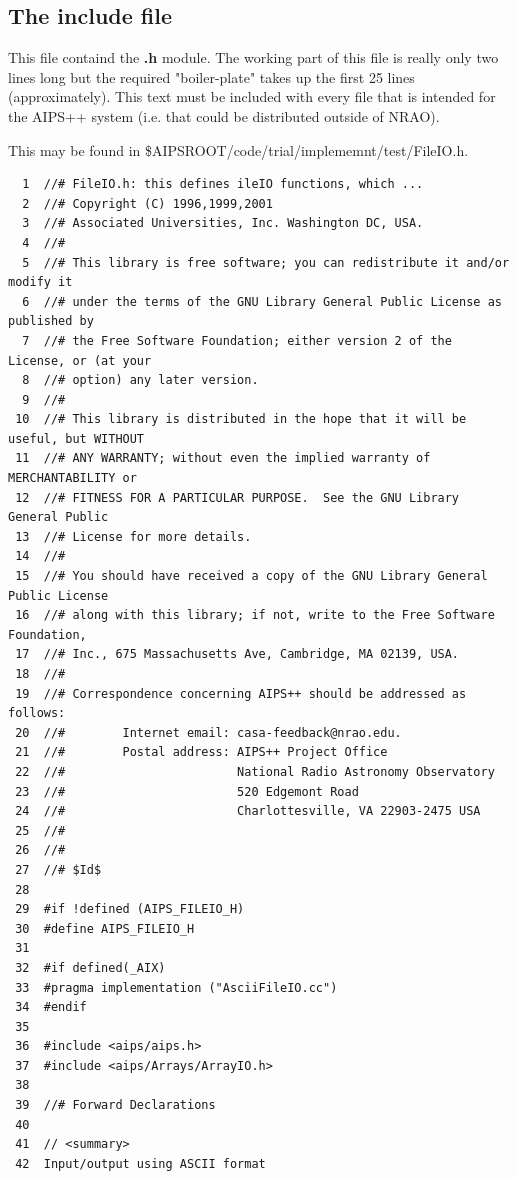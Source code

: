 \newpage
\subsection{The {\bf include} file}

        This file containd the {\bf .h} module.         The working part of
this file is really only two lines long but the required
"boiler-plate" takes up the first 25 lines (approximately). This text
must be included with every file that is intended for the AIPS++
system (i.e. that could be distributed outside of NRAO).  



\newpage

This 
may be found in \$AIPSROOT/code/trial/implememnt/test/FileIO.h.
\begin{verbatim}
  1  //# FileIO.h: this defines ileIO functions, which ...
  2  //# Copyright (C) 1996,1999,2001
  3  //# Associated Universities, Inc. Washington DC, USA.
  4  //#
  5  //# This library is free software; you can redistribute it and/or modify it
  6  //# under the terms of the GNU Library General Public License as published by
  7  //# the Free Software Foundation; either version 2 of the License, or (at your
  8  //# option) any later version.
  9  //#
 10  //# This library is distributed in the hope that it will be useful, but WITHOUT
 11  //# ANY WARRANTY; without even the implied warranty of MERCHANTABILITY or
 12  //# FITNESS FOR A PARTICULAR PURPOSE.  See the GNU Library General Public
 13  //# License for more details.
 14  //#
 15  //# You should have received a copy of the GNU Library General Public License
 16  //# along with this library; if not, write to the Free Software Foundation,
 17  //# Inc., 675 Massachusetts Ave, Cambridge, MA 02139, USA.
 18  //#
 19  //# Correspondence concerning AIPS++ should be addressed as follows:
 20  //#        Internet email: casa-feedback@nrao.edu.
 21  //#        Postal address: AIPS++ Project Office
 22  //#                        National Radio Astronomy Observatory
 23  //#                        520 Edgemont Road
 24  //#                        Charlottesville, VA 22903-2475 USA
 25  //#
 26  //#
 27  //# $Id$
 28
 29  #if !defined (AIPS_FILEIO_H)
 30  #define AIPS_FILEIO_H
 31
 32  #if defined(_AIX)
 33  #pragma implementation ("AsciiFileIO.cc")
 34  #endif
 35
 36  #include <aips/aips.h>
 37  #include <aips/Arrays/ArrayIO.h>
 38
 39  //# Forward Declarations
 40
 41  // <summary>
 42  Input/output using ASCII format

\end{verbatim}
